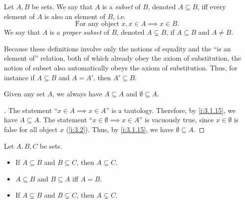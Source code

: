 \begin{defn}[Subsets]\label{i:3.1.15}
  Let \(A, B\) be sets.
  We say that \(A\) is a \emph{subset} of \(B\), denoted \(A \subseteq B\), iff every element of \(A\) is also an element of \(B\), i.e.
  \[
    \text{For any object } x, x \in A \implies x \in B.
  \]
  We say that \(A\) is a \emph{proper subset} of \(B\), denoted \(A \subsetneq B\), if \(A \subseteq B\) and \(A \neq B\).
\end{defn}

\begin{rmk}\label{i:3.1.16}
  Because these definitions involve only the notions of equality and the ``is an element of'' relation, both of which already obey the axiom of substitution, the notion of subset also automatically obeys the axiom of substitution.
  Thus, for instance if \(A \subseteq B\) and \(A = A'\), then \(A' \subseteq B\).
\end{rmk}

\begin{eg}\label{i:3.1.17}
  Given any set \(A\), we always have \(A \subseteq A\) and \(\emptyset \subseteq A\).
\end{eg}

\begin{proof}[]
  The statement ``\(x \in A \implies x \in A\)'' is a tautology.
  Therefore, by \cref{i:3.1.15}, we have \(A \subseteq A\).
  The statement ``\(x \in \emptyset \implies x \in A\)'' is vacuously true, since \(x \in \emptyset\) is false for all object \(x\) (\cref{i:3.2}).
  Thus, by \cref{i:3.1.15}, we have \(\emptyset \subseteq A\).
\end{proof}

\begin{prop}\label{i:3.1.18}
  Let \(A, B, C\) be sets.
  \begin{itemize}
    \item If \(A \subseteq B\) and \(B \subseteq C\), then \(A \subseteq C\).
    \item \(A \subseteq B\) and \(B \subseteq A\) iff \(A = B\).
    \item If \(A \subsetneq B\) and \(B \subsetneq C\), then \(A \subsetneq C\).
  \end{itemize}
\end{prop}


